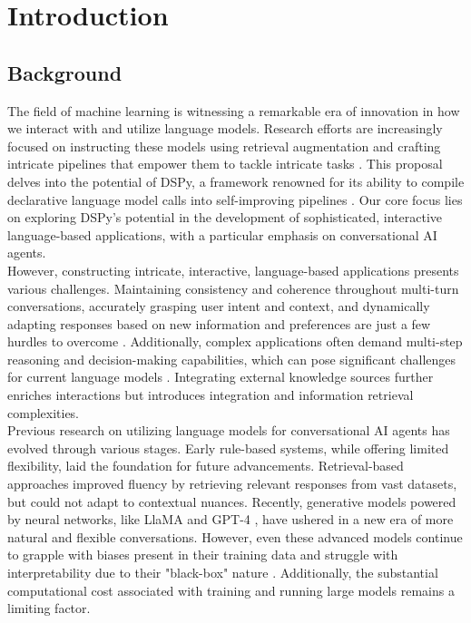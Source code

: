 \chapter{Introduction}
\quad  

\section{Background}

The field of machine learning is witnessing a remarkable era of innovation in how we interact with and utilize language models. Research efforts are increasingly focused on instructing these models using retrieval augmentation and crafting intricate pipelines  that empower them to tackle intricate tasks \parencite{Lewis2020}. This proposal delves into the potential of DSPy, a framework renowned for its ability to compile declarative language model calls into self-improving pipelines \parencite{Khattab2023}. Our core focus lies on exploring DSPy's potential in the development of sophisticated, interactive language-based applications, with a particular emphasis on conversational AI agents.
\\

However, constructing intricate, interactive, language-based applications presents various challenges. Maintaining consistency and coherence throughout multi-turn conversations, accurately grasping user intent and context, and dynamically adapting responses based on new information and preferences are just a few hurdles to overcome \parencite{Vaswani2017}. Additionally, complex applications often demand multi-step reasoning and decision-making capabilities, which can pose significant challenges for current language models \parencite{Zha2023}. Integrating external knowledge sources further enriches interactions but introduces integration and information retrieval complexities.
\\

Previous research on utilizing language models for conversational AI agents has evolved through various stages. Early rule-based systems, while offering limited flexibility, laid the foundation for future advancements. Retrieval-based approaches improved fluency by retrieving relevant responses from vast datasets, but could not adapt to contextual nuances. Recently, generative models powered by neural networks, like LlaMA \parencite{llama2022} and GPT-4 \parencite{gpt4}, have ushered in a new era of more natural and flexible conversations. However, even these advanced models continue to grapple with biases present in their training data and struggle with interpretability due to their "black-box" nature \parencite{Mehrabi2019}. Additionally, the substantial computational cost associated with training and running large models remains a limiting factor.
\\

